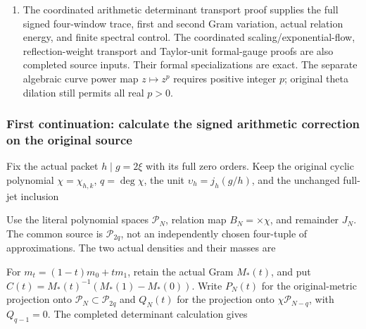\begin{enumerate}
  domains and constants. These historical calculations do not replace
  the accepted tau-base arithmetic construction.
\item
  The coordinated arithmetic determinant transport proof supplies the
  full signed four-window trace, first and second Gram variation, actual
  relation energy, and finite spectral control. The coordinated
  scaling/exponential-flow, reflection-weight transport and Taylor-unit
  formal-gauge proofs are also completed source inputs. Their formal
  specializations are exact. The separate algebraic curve power map
  \(z\mapsto z^p\) requires positive integer \(p\); original theta
  dilation still permits all real \(p>0\).
\end{enumerate}

\subsubsection{First continuation: calculate the signed arithmetic
correction on the original
source}\label{first-continuation-calculate-the-signed-arithmetic-correction-on-the-original-source}

Fix the actual packet \(h\mid g=2\xi\) with its full zero orders. Keep
the original cyclic polynomial \(\chi=\chi_{h,k}\), \(q=\deg\chi\), the
unit \(\upsilon_h=j_h(g/h)\), and the unchanged full-jet inclusion


Use the literal polynomial spaces \(\mathcal P_N\), relation map
\(B_N=\times\chi\), and remainder \(J_N\). The common source is
\(\mathcal P_{2q}\), not an independently chosen four-tuple of
approximations. The two actual densities and their masses are

 

For \(m_t=(1-t)m_0+tm_1\), retain the actual Gram \(M_*(t)\), and put
\(C(t)=M_*(t)^{-1}(M_*(1)-M_*(0))\). Write \(P_N(t)\) for the
original-metric projection onto \(\mathcal P_N\subset\mathcal P_{2q}\)
and \(Q_N(t)\) for the projection onto \(\chi\mathcal P_{N-q}\), with
\(Q_{q-1}=0\). The completed determinant calculation gives

 

